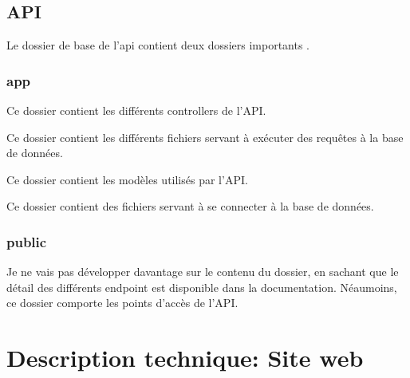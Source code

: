 \documentclass[a4paper,12pt,french]{sphinxmanual}
\begin{document}
\subsection{API}
\label{\detokenize{organique:api}}
\sphinxAtStartPar
{}

\sphinxAtStartPar
Le dossier de base de l’api contient deux dossiers importants .


\subsubsection{app}
\label{\detokenize{organique:app}}
\sphinxAtStartPar
{}

\sphinxAtStartPar
{}

\sphinxAtStartPar
Ce dossier contient les différents controllers de l’API.

\sphinxAtStartPar
{}

\sphinxAtStartPar
Ce dossier contient les différents fichiers servant à exécuter des requêtes à la base de données.

\sphinxAtStartPar
{}

\sphinxAtStartPar
Ce dossier contient les modèles utilisés par l’API.

\sphinxAtStartPar
{}

\sphinxAtStartPar
Ce dossier contient des fichiers servant à se connecter à la base de données.


\subsubsection{public}
\label{\detokenize{organique:public}}
\sphinxAtStartPar
Je ne vais pas développer davantage sur le contenu du dossier, en sachant que le détail des différents endpoint est disponible dans la documentation. Néaumoins, ce dossier comporte les points d’accès de l’API.


\section{Description technique: Site web}
\label{\detokenize{organique:description-technique-site-web}}
\end{document}
